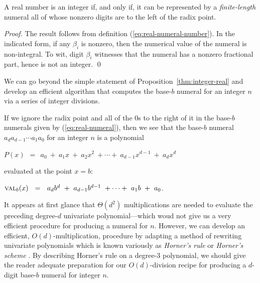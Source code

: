 \begin{prop}
\label{thm:integer-real}
A real number is an integer if, and only if, it can be represented by
a {\em finite-length} numeral all of whose nonzero digits are to the
left of the radix point.
\end{prop}

\begin{proof}
The result follows from definition (\ref{eq:real-numeral-number}).  In
the indicated form, if any $\beta_i$ is nonzero, then the numerical
value of the numeral is non-integral.  To wit, digit $\beta_i$
witnesses that the numeral has a nonzero fractional part, hence is not
an integer.  \qed
\end{proof}

We can go beyond the simple statement of
Proposition~\ref{thm:integer-real} and develop an efficient algorithm
that computes the base-$b$ numeral for an integer $n$ via a series of
integer divisions.

\bigskip

%
If we ignore the radix point and all of the $0$s to the right of it in
the base-$b$ numerals given by (\ref{eq:real-numeral}), then we see
that the base-$b$ numeral $a_d a_{d-1} \cdots a_1 a_0$ for an integer
$n$ is a polynomial

$P(x) \ \ = \ \ a_0 \ + \ a_1 x \ + \ a_2 x^2 \ + \cdots + \ a_{d-1}
x^{d-1} \ + \ a_d x^d$

\noindent
evaluated at the point $x=b$:

$\mbox{\sc val}_{b}(x) \ \ = \ \ a_d b^d \ + \ a_{d-1} b^{d-1} \ +
\cdots + \ a_1 b \ + \ a_0$.

\noindent
It appears at first glance that $\Theta(d^2)$ multiplications are
needed to evaluate the preceding degree-$d$ univariate
polynomial---which woud not give us a very efficient procedure for
producing a numeral for $n$.  However, we can develop an efficient,
$O(d)$-multiplication, procedure by adapting a method of rewriting
univariate polynomials which is known variously as {\it Horner's rule}
or {\it Horner's scheme} \cite{Horner}. 
 By describing Horner's rule on a degree-$3$
polynomial, we should give the reader adequate preparation for our
$O(d)$-division recipe for producing a $d$-digit base-$b$ numeral for
integer $n$.

\medskip

